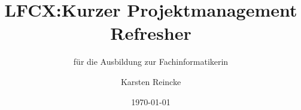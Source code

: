 \documentclass[]{beamer}
\title{LFCX:Kurzer Projektmanagement Refresher}
\subtitle{für die Ausbildung zur Fachinformatikerin}
\institute[GS-LDK]{Gewerbliche Schulen Dillenburg}
\author{Karsten Reincke}
\date{\today}
\def\cfgGl{../../../cfg.gl/}
\begin{document}

\begin{frame}
  \titlepage

  
\end{frame}






\logo{}
\newpage



%
\end{document}
